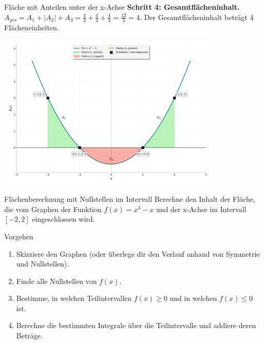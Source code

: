 \begin{beispielumgebung}{Fläche mit Anteilen unter der x-Achse}
\textbf{Schritt 4: Gesamtflächeninhalt.}
$A_{ges} = A_1 + |A_2| + A_3 = \frac{4}{3} + \frac{4}{3} + \frac{4}{3} = \frac{12}{3} = 4$.
Der Gesamtflächeninhalt beträgt 4 Flächeneinheiten.
\begin{center}
    \includegraphics[width=0.8\textwidth]{grafiken/Integral_Flaeche_xhoch2minus1.png}
    \label{fig:flaeche_x2minus1}
\end{center}
\end{beispielumgebung}

\begin{aufgabenumgebung}{Flächenberechnung mit Nullstellen im Intervall}
Berechne den Inhalt der Fläche, die vom Graphen der Funktion $f(x) = x^3 - x$ und der x-Achse im Intervall $[-2, 2]$ eingeschlossen wird.
\begin{tippumgebung}{Vorgehen}
\begin{enumerate}
    \item Skizziere den Graphen (oder überlege dir den Verlauf anhand von Symmetrie und Nullstellen).
    \item Finde alle Nullstellen von $f(x)$.
    \item Bestimme, in welchen Teilintervallen $f(x) \ge 0$ und in welchen $f(x) \le 0$ ist.
    \item Berechne die bestimmten Integrale über die Teilintervalle und addiere deren Beträge.
\end{enumerate}
\end{tippumgebung}
\end{aufgabenumgebung}

